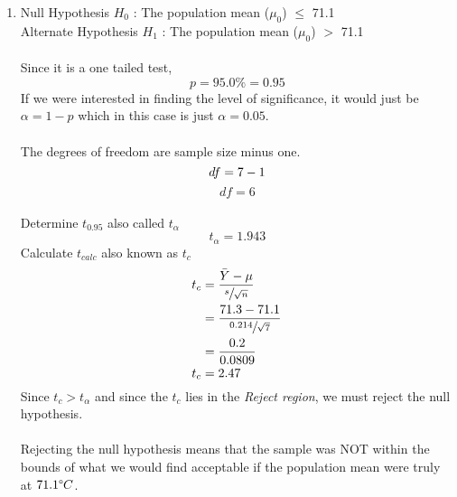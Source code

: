 \documentclass{book}
\begin{document}
\begin{enumerate}
    \item 
    Null Hypothesis $H_0$ : The population mean ($\mu_0$) $\leq$ 71.1\\
    Alternate Hypothesis $H_1$ : The population mean ($\mu_0$) $>$ 71.1\\\\
    Since it is a one tailed test,
    \begin{equation*}
        p=95.0\%=0.95
    \end{equation*}
    If we were interested in finding the level of significance, it would just be $\alpha=1-p$ which in this case is just $\alpha=0.05$.\\\\
    The degrees of freedom are sample size minus one.
    \begin{equation*}
        df = 7 - 1\\
    \end{equation*}
    \begin{equation*}
        df = 6
    \end{equation*}\\
    Determine $t_{0.95}$ also called $t_\alpha$
    \begin{equation*}
        t_\alpha=1.943
    \end{equation*}
    Calculate $t_{calc}$ also known as $t_c$
    \begin{align*}
        t_c &= \frac{\Bar{Y}-\mu}{\sfrac{s}{\sqrt{n}}}\\
        &= \frac{71.3-71.1}{\sfrac{0.214}{\sqrt{7}}}\\
        &= \frac{0.2}{0.0809}\\
        t_c &= 2.47
    \end{align*}
    Since $t_c > t_\alpha$ and since the $t_c$ lies in the \textit{Reject region}, we must reject the null hypothesis.\\\\
    Rejecting the null hypothesis means that the sample was NOT within the bounds of what we would find acceptable if the population mean were truly at $71.1\degree C$.\\
    

\end{enumerate}
\end{document}
